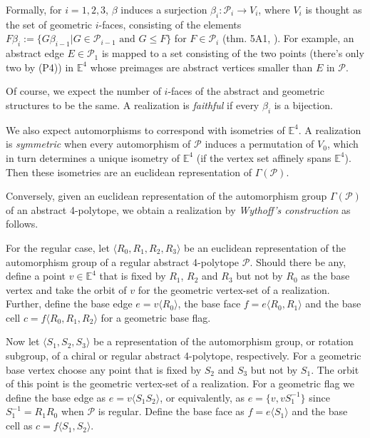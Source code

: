\documentclass{article}
\theoremstyle{definition}
\newcommand{\E}{\mathbb{E}}
\newcommand{\p}{\mathcal{P}}
\begin{document}
	Formally, for $i=1,2,3$, $\beta$ induces a surjection $\beta_i:\p_i\to V_i$, where $V_i$ is thought as the set of geometric $i$-faces, consisting of the elements ${F\beta_i:=\{G\beta_{i-1}|G\in\p_{i-1}\text{ and }G\leq F\}}$ for $F\in\p_i$ (thm. 5A1, \cite{abstract-polytopes}). For example, an abstract edge $E\in\p_1$ is mapped to a set consisting of the two points (there's only two by (P4)) in $\E^4$ whose preimages are abstract vertices smaller than $E$ in $\p$.

	

	Of course, we expect the number of $i$-faces of the abstract and geometric structures to be the same. A realization is \textit{faithful} if every $\beta_i$ is a bijection.
	
	We also expect automorphisms to correspond with isometries of $\E^4$. A realization is \textit{symmetric} when every automorphism of $\p$ induces a permutation of $V_0$, which in turn determines a unique isometry of $\E^4$ (if the vertex set affinely spans $\E^4$). Then these isometries are an euclidean representation of $\Gamma(\p)$.
	
	Conversely, given an euclidean representation of the automorphism group $\Gamma(\p)$ of an abstract 4-polytope, we obtain a realization by \textit{Wythoff's construction} as follows.
	
	For the regular case, let $\langle R_0, R_1,R_2,R_3\rangle$ be an euclidean representation of the automorphism group of a regular abstract 4-polytope $\p$. Should there be any, define a point $v\in\E^4$ that is fixed by $R_1$, $R_2$ and $R_3$ but not by $R_0$ as the base vertex and take the orbit of $v$ for the geometric vertex-set of a realization. Further, define the base edge $e=v\langle R_0\rangle$, the base face $f=e\langle R_0,R_1\rangle$ and the base cell $c=f\langle R_0,R_1,R_2\rangle$ for a geometric base flag.
	
	Now let $\langle S_1,S_2,S_3\rangle$ be a representation of the automorphism group, or rotation subgroup, of a chiral or regular abstract 4-polytope, respectively. For a geometric base vertex choose any point that is fixed by $S_2$ and $S_3$ but not by $S_1$. The orbit of this point is the geometric vertex-set of a realization. For a geometric flag we define the base edge as $e=v\langle S_1S_2\rangle$, or equivalently, as $e=\{v,vS_1^{-1}\}$ since $S_1^{-1}=R_1R_0$ when $\p$ is regular. Define the base face as $f=e\langle S_1\rangle$ and the base cell as $c=f\langle S_1,S_2\rangle$.
	
\end{document}
